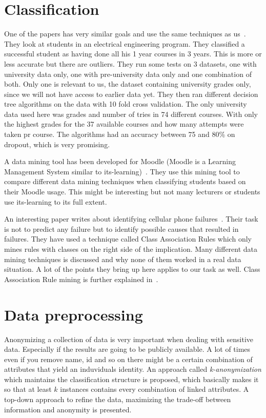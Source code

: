 \section{Classification}
One of the papers has very similar goals and use the same techniques as us~\cite{7}.
They look at students in an electrical engineering program. 
They classified a successful student as having done all his 1 year courses in 3 years. 
This is more or less accurate but there are outliers. 
They run some tests on 3 datasets, one with university data only, one with pre-university data only and one combination of both. 
Only one is relevant to us, the dataset containing university grades only, since we will not have access to earlier data yet. 
They then ran different decision tree algorithms on the data with 10 fold cross validation. 
The only university data used here was grades and number of tries in 74 different courses. 
With only the highest grades for the 37 available courses and how many attempts were taken pr course.
The algorithms had an accuracy between 75 and 80\% on dropout, which is very promising.

\bigskip\noindent
A data mining tool has been developed for Moodle (Moodle is a Learning Management System similar to its-learning)~\cite{12}.
They use this mining tool to compare different data mining techniques when classifying students based on their Moodle usage. 
This might be interesting but not many lecturers or students use its-learning to its full extent. 

\bigskip\noindent
An interesting paper writes about identifying cellular phone failures~\cite{3}.
Their task is not to predict any failure but to identify possible causes that resulted in failures.  
They have used a technique called Class Association Rules which only mines rules with classes on the right side of the implication. 
Many different data mining techniques is discussed and why none of them worked in a real data situation. 
A lot of the points they bring up here applies to our task as well.
Class Association Rule mining is further explained in~\cite{4}.

\section{Data preprocessing}
Anonymizing a collection of data is very important when dealing with sensitive data. 
Especially if the results are going to be publicly available. 
A lot of times even if you remove name, id and so on there might be a certain combination of attributes that yield an induviduals identity.
An approach called \textit{k-anonymization} which maintains the classification structure is proposed, 
which basically makes it so that at least $k$ instances contains every combination of linked attributes. 
A top-down approach to refine the data, maximizing the trade-off between information and anonymity is presented.~\cite{14}

